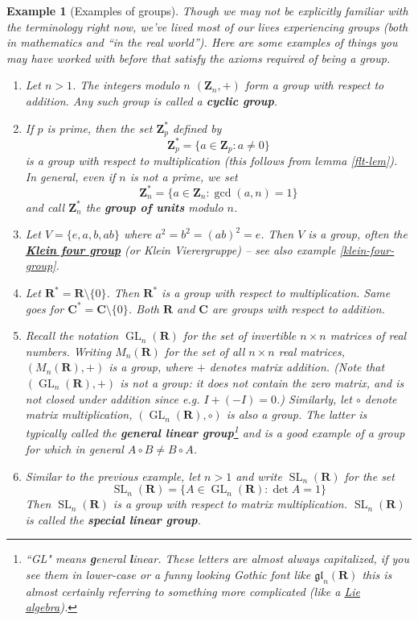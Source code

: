 \documentclass[12pt]{article}
\numberwithin{equation}{subsection}
\theoremstyle{note}
\newtheorem{example}[subsection]{Example}
\newcommand{\GL}{\operatorname{GL}}
\newcommand{\SL}{\operatorname{SL}}
\begin{document}
\begin{example}[Examples of groups] \label{groups-example} Though we may not be explicitly familiar with the terminology right now, we've lived most of our lives experiencing groups (both in mathematics and ``in the real world''). Here are some examples of things you may have worked with before that satisfy the axioms required of being a group.

\begin{enumerate}
\item Let $n>1$. The integers modulo $n$ $(\mathbf{Z}_n,+)$ form a group with respect to addition. Any such group is called a \textbf{cyclic group}.
\item \label{star-Zn} If $p$ is prime, then the set $\mathbf{Z}_p^*$ defined by \[ \mathbf{Z}_p^*=\{ a\in\mathbf{Z}_p : a\neq 0\}\] is a group with respect to multiplication (this follows from lemma \ref{flt-lem}). In general, even if $n$ is not a prime, we set \begin{equation} \mathbf{Z}_n^*=\{ a\in\mathbf{Z}_n : \gcd(a,n)=1\}\end{equation} and call $\mathbf{Z}_n^*$ the \textbf{group of units} modulo $n$. 
\item Let $V=\{e,a,b,ab\}$ where $a^2=b^2=(ab)^2=e$. Then $V$ is a group, often the \href{https://en.wikipedia.org/wiki/Klein_four-group}{\textbf{Klein four group}} (or \textit{Klein Vierergruppe}) -- see also example \ref{klein-four-group}.
\item Let $\mathbf{R}^*=\mathbf{R}\setminus \{0\}$. Then $\mathbf{R}^*$ is a group with respect to multiplication. Same goes for $\mathbf{C}^*=\mathbf{C}\setminus \{0\}$. Both $\mathbf{R}$ and $\mathbf{C}$ are groups with respect to addition.
\item Recall the notation $\GL_n(\mathbf{R})$ for the set of invertible $n\times n$ matrices of real numbers. Writing $M_n(\mathbf{R})$ for the set of \textit{all} $n\times n$ real matrices, $(M_n(\mathbf{R}),+)$ is a group, where $+$ denotes matrix addition. (Note that $(\GL_n(\mathbf{R}),+)$ is \textit{not} a group: it does not contain the zero matrix, and is not closed under addition since e.g. $I+(-I)=0$.) Similarly, let $\circ$ denote matrix multiplication, $(\GL_n(\mathbf{R}),\circ)$ is also a group. The latter is typically called the \textbf{general linear group}\footnote{``GL" means \textbf{g}eneral \textbf{l}inear. These letters are almost always capitalized, if you see them in lower-case or a funny looking Gothic font like $\mathfrak{gl}_n(\mathbf{R})$ this is almost certainly referring to something more complicated (like a \href{https://en.wikipedia.org/wiki/Lie_algebra}{Lie algebra}).} and is a good example of a group for which in general $A\circ B\neq B\circ A$.
\item Similar to the previous example, let $n>1$ and write $\SL_n (\mathbf{R})$ for the set \begin{equation} \SL_n(\mathbf{R})=\{ A\in\GL_n(\mathbf{R}) : \det A=1\}\end{equation} Then $\SL_n(\mathbf{R})$ is a group with respect to matrix multiplication. $\SL_n(\mathbf{R})$ is called the \textbf{special linear group}.


\end{enumerate}
\end{example}
\end{document}
